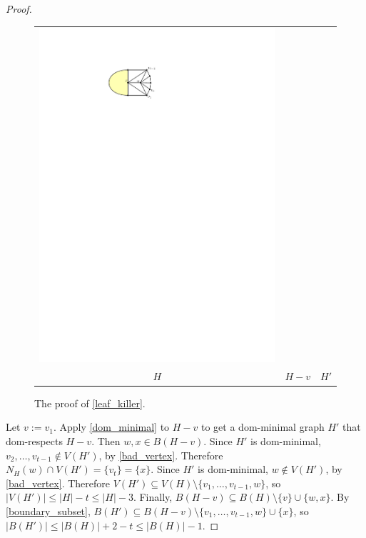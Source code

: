 \documentclass{article}
\theoremstyle{definition}
\begin{document}
\begin{proof}
\begin{figure}[htbp]
\begin{tabular}{ccc}
      \includegraphics[page=3]{figs/killing_a_leaf} \\
      $H$ & $H-v$ & $H'$
    \end{tabular}
    \caption{The proof of \cref{leaf_killer}.}
    \label{killing_a_leaf}
  \end{figure}

  Let $v:=v_1$. Apply \cref{dom_minimal} to $H-v$ to get a dom-minimal graph $H'$ that dom-respects $H-v$.  Then $w,x\in B(H-v)$.  Since $H'$ is dom-minimal, $v_2,\ldots,v_{t-1}\not\in V(H')$, by \cref{bad_vertex}.  Therefore $N_H(w)\cap V(H')=\{v_t\}=\{x\}$. Since $H'$ is dom-minimal, $w\not\in V(H')$, by \cref{bad_vertex}. Therefore $V(H')\subseteq V(H)\setminus\{v_1,\ldots,v_{t-1},w\}$, so $|V(H')|\le |H|-t\le |H|-3$.  Finally, $B(H-v)\subseteq B(H)\setminus \{v\}\cup\{w,x\}$. By \cref{boundary_subset}, $B(H')\subseteq B(H-v)\setminus\{v_1,\ldots,v_{t-1},w\}\cup\{x\}$, so $|B(H')|\le |B(H)|+2-t\le |B(H)|-1$.
\end{proof}
\end{document}
